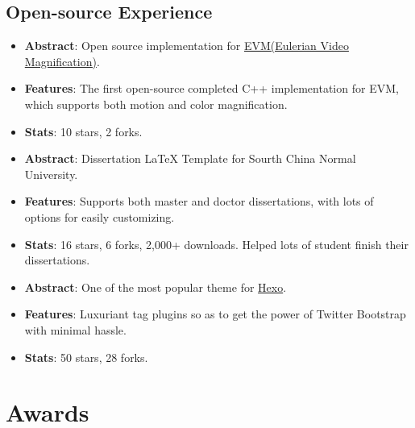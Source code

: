 \documentclass[11pt,a4paper,nolmodern]{moderncv}
\begin{document}
\subsection{Open-source Experience}

%
  {
\begin{itemize}
\item \textbf{Abstract}: Open source implementation for \href{http://people.csail.mit.edu/mrub/vidmag/}{EVM(Eulerian Video Magnification)}.
\item \textbf{Features}: The first open-source completed C++ implementation for EVM, which supports both motion and color magnification.
\item \textbf{Stats}: 10 stars, 2 forks.
\end{itemize}}

%
  {
\begin{itemize}
\item \textbf{Abstract}: Dissertation LaTeX Template for Sourth China Normal
  University.
\item \textbf{Features}: Supports both master and doctor dissertations, with lots of options for easily customizing.
\item \textbf{Stats}: 16 stars, 6 forks, 2,000+ downloads. Helped lots of
  student finish their dissertations.
\end{itemize}}

%
  {
\begin{itemize}
\item \textbf{Abstract}: One of the most popular theme for \href{hexo.io}{Hexo}.
\item \textbf{Features}: Luxuriant tag plugins so as to get the power of Twitter Bootstrap with minimal hassle.
\item \textbf{Stats}: 50 stars, 28 forks.
\end{itemize}}

\section{Awards}

\end{document}
